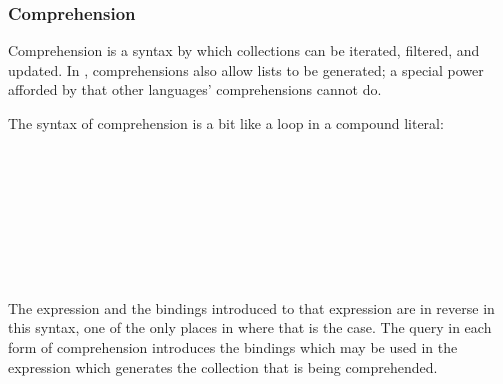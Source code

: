 \subsubsection{Comprehension}

Comprehension is a syntax by which collections can be iterated, filtered, and updated.
In \Trilogy{}, comprehensions also allow lists to be generated; a special power afforded
by \Law{} that other languages' comprehensions cannot do.

The syntax of comprehension is a bit like a  loop in a compound literal:

\begin{bnf*}
     \\
     \\
     \\
     \\
     \\
     \\
     \\
\end{bnf*}

The expression and the bindings introduced to that expression are in reverse in
this syntax, one of the only places in \Trilogy{} where that is the case. The
query in each form of comprehension introduces the bindings which may be used
in the expression which generates the collection that is being comprehended.

